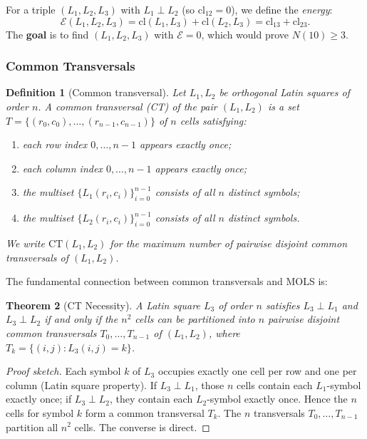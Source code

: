 \documentclass[11pt,a4paper]{article}
\newtheorem{theorem}{Theorem}[section]
\newtheorem{definition}[theorem]{Definition}
\theoremstyle{remark}
\newcommand{\CT}{\mathrm{CT}}
\newcommand{\cl}{\mathrm{cl}}
\newcommand{\E}{\mathcal{E}}
\begin{document}
For a triple $(L_1, L_2, L_3)$ with $L_1 \perp L_2$ (so $\cl_{12} = 0$), we define the
\emph{energy}:
\[
  \E(L_1, L_2, L_3) = \cl(L_1, L_3) + \cl(L_2, L_3) = \cl_{13} + \cl_{23}.
\]
The \textbf{goal} is to find $(L_1, L_2, L_3)$ with $\E = 0$, which would prove
$N(10) \geq 3$.

\subsubsection{Common Transversals}

\begin{definition}[Common transversal]
Let $L_1, L_2$ be orthogonal Latin squares of order $n$. A \emph{common transversal} (CT)
of the pair $(L_1, L_2)$ is a set $T = \{(r_0, c_0), \ldots, (r_{n-1}, c_{n-1})\}$ of
$n$ cells satisfying:
\begin{enumerate}[label=(\roman*),noitemsep]
  \item each row index $0, \ldots, n-1$ appears exactly once;
  \item each column index $0, \ldots, n-1$ appears exactly once;
  \item the multiset $\{L_1(r_i, c_i)\}_{i=0}^{n-1}$ consists of all $n$ distinct symbols;
  \item the multiset $\{L_2(r_i, c_i)\}_{i=0}^{n-1}$ consists of all $n$ distinct symbols.
\end{enumerate}
We write $\CT(L_1, L_2)$ for the maximum number of pairwise disjoint common transversals of
$(L_1, L_2)$.
\end{definition}

The fundamental connection between common transversals and MOLS is:

\begin{theorem}[CT Necessity]\label{thm:ct_necessity}
A Latin square $L_3$ of order $n$ satisfies $L_3 \perp L_1$ and $L_3 \perp L_2$ if and
only if the $n^2$ cells can be partitioned into $n$ pairwise disjoint common transversals
$T_0, \ldots, T_{n-1}$ of $(L_1, L_2)$, where $T_k = \{(i,j) : L_3(i,j) = k\}$.
\end{theorem}

\begin{proof}[Proof sketch]
Each symbol $k$ of $L_3$ occupies exactly one cell per row and one per column (Latin
square property). If $L_3 \perp L_1$, those $n$ cells contain each $L_1$-symbol exactly
once; if $L_3 \perp L_2$, they contain each $L_2$-symbol exactly once. Hence the $n$
cells for symbol $k$ form a common transversal $T_k$. The $n$ transversals $T_0,\ldots,T_{n-1}$
partition all $n^2$ cells. The converse is direct.
\end{proof}
\end{document}
